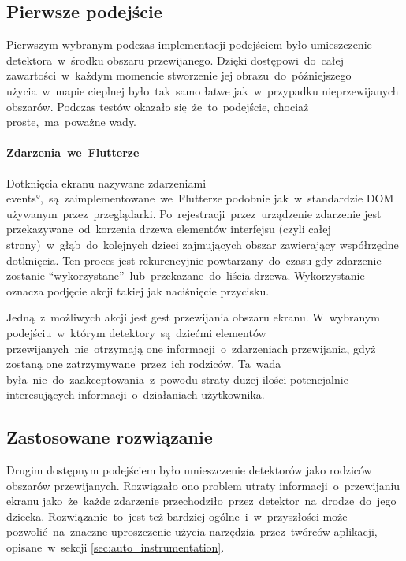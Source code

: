 
\subsection{Pierwsze podejście}
Pierwszym wybranym podczas implementacji podejściem było umieszczenie detektora~w~środku obszaru przewijanego. Dzięki dostępowi~do~całej zawartości~w~każdym momencie stworzenie jej obrazu~do~późniejszego użycia~w~mapie cieplnej było~tak~samo łatwe jak~w~przypadku nieprzewijanych obszarów. Podczas testów okazało się~że~to~podejście, chociaż proste,~ma~poważne wady.

\paragraph{Zdarzenia~we~Flutterze}
Dotknięcia ekranu nazywane zdarzeniami \ang{events},~są~zaimplementowane~we~Flutterze podobnie jak~w~standardzie DOM używanym~przez~przeglądarki. Po~rejestracji~przez~urządzenie zdarzenie jest przekazywane~od~korzenia drzewa elementów interfejsu (czyli całej strony)~w~głąb~do~kolejnych dzieci zajmujących obszar zawierający współrzędne dotknięcia. Ten proces jest rekurencyjnie powtarzany~do~czasu gdy zdarzenie zostanie ``wykorzystane''~lub~przekazane~do~liścia drzewa. Wykorzystanie oznacza podjęcie akcji takiej jak naciśnięcie przycisku.

Jedną~z~możliwych akcji jest gest przewijania obszaru ekranu. W~wybranym podejściu~w~którym detektory~są~dziećmi elementów przewijanych~nie~otrzymają one informacji~o~zdarzeniach przewijania, gdyż zostaną one zatrzymywane~przez~ich rodziców. Ta~wada była~nie~do~zaakceptowania~z~powodu straty dużej ilości potencjalnie interesujących informacji~o~działaniach użytkownika.

\subsection{Zastosowane rozwiązanie}
Drugim dostępnym podejściem było umieszczenie detektorów jako rodziców obszarów przewijanych. Rozwiązało ono problem utraty informacji~o~przewijaniu ekranu jako~że~każde zdarzenie przechodziło~przez~detektor~na~drodze~do~jego dziecka. Rozwiązanie~to~jest też bardziej ogólne~i~w~przyszłości może pozwolić~na~znaczne uproszczenie użycia narzędzia~przez~twórców aplikacji, opisane~w~sekcji \ref{sec:auto_instrumentation}. 

